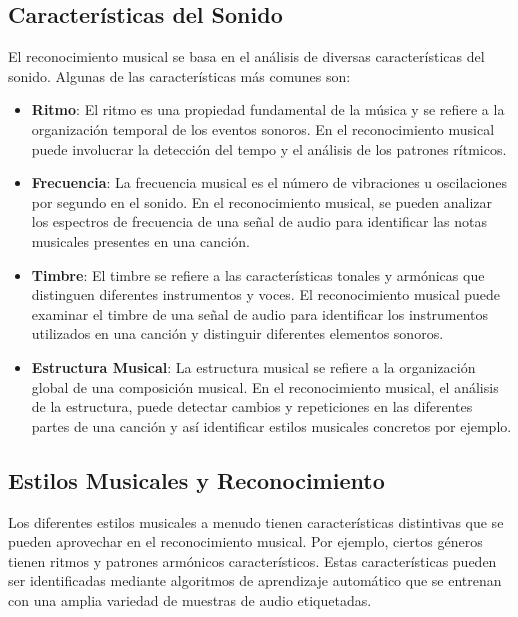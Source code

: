\subsection{Características del Sonido}

El reconocimiento musical se basa en el análisis de diversas características del sonido. Algunas de las características más comunes son:

\begin{itemize}
\item \textbf{Ritmo}: El ritmo es una propiedad fundamental de la música y se refiere a la organización temporal de los eventos sonoros. En el reconocimiento musical puede involucrar la detección del tempo y el análisis de los patrones rítmicos.

\item \textbf{Frecuencia}: La frecuencia musical es el número de vibraciones u oscilaciones por segundo en el sonido. En el reconocimiento musical, se pueden analizar los espectros de frecuencia de una señal de audio para identificar las notas musicales presentes en una canción.

\item \textbf{Timbre}: El timbre se refiere a las características tonales y armónicas que distinguen diferentes instrumentos y voces. El reconocimiento musical puede examinar el timbre de una señal de audio para identificar los instrumentos utilizados en una canción y distinguir diferentes elementos sonoros.

\item \textbf{Estructura Musical}: La estructura musical se refiere a la organización global de una composición musical. En el reconocimiento musical, el análisis de la estructura, puede detectar cambios y repeticiones en las diferentes partes de una canción y así identificar estilos musicales concretos por ejemplo.
\end{itemize}

\subsection{Estilos Musicales y Reconocimiento}
Los diferentes estilos musicales a menudo tienen características distintivas que se pueden aprovechar en el reconocimiento musical. Por ejemplo, ciertos géneros tienen ritmos y patrones armónicos característicos. 
Estas características pueden ser identificadas mediante algoritmos de aprendizaje automático que se entrenan con una amplia variedad de muestras de audio etiquetadas.

